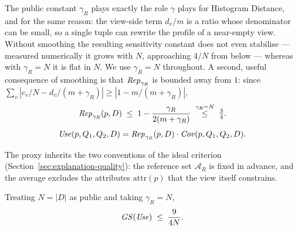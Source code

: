 The public constant $\gamma_R$ plays exactly the role $\gamma$ plays for Histogram Distance, and for the same reason: the view-side term $d_v/m$ is a ratio whose denominator can be small, so a single tuple can rewrite the profile of a near-empty view.
Without smoothing the resulting sensitivity constant does not even stabilise --- measured numerically it grows with $N$, approaching $4/N$ from below --- whereas with $\gamma_R=N$ it is flat in $N$.
We use $\gamma_R=N$ throughout.
A second, useful consequence of smoothing is that $\mathit{Rep}_{\gamma_R}$ is bounded away from $1$: since $\sum_v|c_v/N-d_v/(m+\gamma_R)|\ge|1-m/(m+\gamma_R)|$,
\begin{equation}
\mathit{Rep}_{\gamma_R}(p,D)\;\le\;1-\frac{\gamma_R}{2(m+\gamma_R)}\;\overset{\gamma_R=N}{\le}\;\tfrac{3}{4}.
\label{eq:rep-upper}
\end{equation}
\begin{equation}
\mathit{Use}(p,Q_1,Q_2,D)= \mathit{Rep}_{\gamma_R}(p,D)\cdot \mathit{Cov}(p,Q_1,Q_2,D).
\label{eq:usefulness-proxy}
\end{equation}

The proxy inherits the two conventions of the ideal criterion (Section~\ref{sec:explanation-quality}): the reference set $\mathcal{A}_R$ is fixed in advance, and the average excludes the attributes $\mathrm{attr}(p)$ that the view itself constrains.

\begin{proposition}
\label{prop:usefulness-sensitivity}
Treating $N=|D|$ as public and taking $\gamma_R=N$,
\[
\mathit{GS}(\mathit{Use})\;\le\;\frac{9}{4N}.
\]
\end{proposition}


